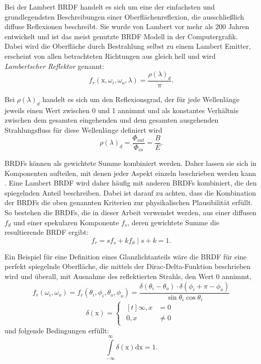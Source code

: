 \documentclass[thesis.tex]{subfiles}
\begin{document}
Bei der Lambert BRDF handelt es sich um eine der einfachsten und grundlegendsten Beschreibungen einer Oberflächenreflexion, die ausschließlich diffuse Reflexionen beschreibt. Sie wurde von Lambert \cite{bib:Lambert1760} vor mehr als 200 Jahren entwickelt und ist das meist genutzte BRDF Modell in der Computergrafik. Dabei wird die Oberfläche durch Bestrahlung selbst zu einem Lambert Emitter, erscheint von allen betrachteten Richtungen aus gleich hell und wird \emph{Lambertscher Reflektor} genannt: 
\begin{equation}
f_r(\mathrm{x}, \omega_i, \omega_o, \lambda) = \frac{\rho(\lambda)_d}{\pi}.
\end{equation}

Bei $\rho(\lambda)_d$ handelt es sich um den Reflexionsgrad, der für jede Wellenlänge jeweils einen Wert zwischen 0 und 1 annimmt und als konstantes Verhältnis zwischen dem gesamten eingehenden und dem gesamten ausgehenden Strahlungsfluss für diese Wellenlänge definiert wird
\begin{equation}
\rho(\lambda)_d = \frac{\Phi_{out}}{\Phi_{in}} = \frac{B}{E}.
\end{equation}

BRDFs können als gewichtete Summe kombiniert werden. Daher lassen sie sich in Komponenten aufteilen, mit denen jeder Aspekt einzeln beschrieben werden kann \cite{bib:TorranceSparrow1967}. Eine Lambert BRDF wird daher häufig mit anderen BRDFs kombiniert, die den spiegelnden Anteil beschreiben. Dabei ist darauf zu achten, dass die Kombination der BRDFs die oben genannten Kriterien zur physikalischen Plausibilität erfüllt. So bestehen die BRDFs, die in dieser Arbeit verwendet werden, aus einer diffusen $f_d$ und einer spekularen Komponente $f_s$, deren gewichtete Summe die resultierende BRDF ergibt:
\begin{equation}
f_r = sf_s + kf_d \mid s+k=1.\label{eq:spec_and_diff_combination}
\end{equation}

Ein Beispiel für eine Definition eines Glanzlichtanteils wäre die BRDF für eine perfekt spiegelnde Oberfläche, die mittels der Dirac-Delta-Funktion beschrieben wird und überall, mit Ausnahme des reflektierten Strahls, den Wert 0 annimmt,
\begin{equation}
f_r(\omega_i, \omega_o) = f_r(\theta_i, \phi_i, \theta_o, \phi_o) = \frac{\delta(\theta_i-\theta_o) \cdot \delta(\phi_i + \pi - \phi_o)}{\sin\theta_i \cos\theta_i}
\label{eq:specular_reflection}\end{equation}
\begin{equation}
\delta(\mathrm{x}) = 
\begin{cases}
\!\begin{aligned}[t]
\infty, x &= 0\\
0, x &\neq 0
\end{aligned}
\end{cases}\tag*{}
\end{equation}
und folgende Bedingungen erfüllt: 
\begin{equation}
\int\limits_{-\infty}^{\infty} \delta(\mathrm{x}) \mathrm{d}\mathrm{x} = 1.
\end{equation}
\end{document}
